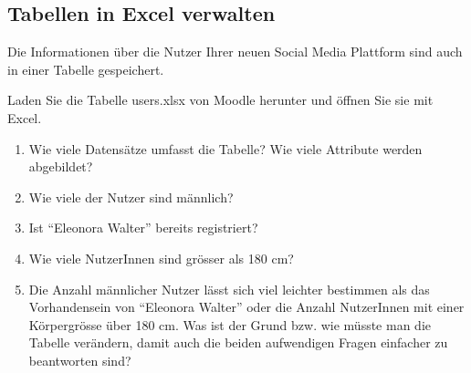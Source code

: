 \subsection{Tabellen in Excel verwalten}
\label{subsec:TabelleInExcel}

Die Informationen über die Nutzer Ihrer neuen Social Media Plattform sind auch in einer Tabelle gespeichert.

\begin{myexercise}
    \label{myexercise:usersinExcel}
      Laden Sie die Tabelle users.xlsx von Moodle herunter und öffnen Sie sie mit Excel.
    \begin{enumerate}
        \item Wie viele Datensätze umfasst die Tabelle? Wie viele Attribute werden abgebildet?
        \item Wie viele der Nutzer sind männlich?
        \item Ist \enquote{Eleonora Walter} bereits registriert?
        \item Wie viele NutzerInnen sind grösser als 180 cm?
        \item Die Anzahl männlicher Nutzer lässt sich viel leichter bestimmen als das Vorhandensein von \enquote{Eleonora Walter} oder die Anzahl NutzerInnen mit einer Körpergrösse über 180 cm. Was ist der Grund bzw. wie müsste man die Tabelle verändern, damit auch die beiden aufwendigen Fragen einfacher zu beantworten sind?
    \end{enumerate}
\end{myexercise}



